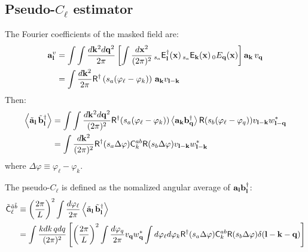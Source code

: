 \documentclass[a4paper,10pt]{article}
\begin{document}
  \subsection{Pseudo-$C_\ell$ estimator}
    The Fourier coefficients of the masked field are:
    \begin{align}
      {\bf a}^v_{\bf l}&=\int\int\frac{d{\bf k}^2d{\bf q}^2}{2\pi}\left[\int\frac{d{\bf x}^2}{(2\pi)^2}\,_{s_a}{\sf E}^\dag_{\bf l}({\bf x})\,_{s_a}{\sf E}_{\bf k}({\bf x})\,_0E_{\bf q}({\bf x})\right]{\bf a}_{\bf k}\,v_{\bf q}\\
                       &=\int\frac{d{\bf k}^2}{2\pi}{\sf R}^\dag\left(s_a(\varphi_\ell-\varphi_k)\right)\,{\bf a}_{\bf k}v_{{\bf l}-{\bf k}}
    \end{align}
    Then:
    \begin{align}
      \left\langle\tilde{\bf a}_{\bf l}\,\tilde{\bf b}^\dag_{\bf l}\right\rangle
      &=\int\int\frac{d{\bf k}^2d{\bf q}^2}{(2\pi)^2}{\sf R}^\dag(s_a(\varphi_\ell-\varphi_k))\left\langle{\bf a}_{\bf k}{\bf b}^\dag_{\bf q}\right\rangle{\sf R}(s_b(\varphi_\ell-\varphi_q))v_{{\bf l}-{\bf k}}w^*_{{\bf l}-{\bf q}}\\
      &=\int\frac{d{\bf k}^2}{(2\pi)^2}{\sf R}^\dag(s_a\Delta\varphi){\sf C}^{ab}_k{\sf R}(s_b\Delta\varphi)v_{{\bf l}-{\bf k}}w^*_{{\bf l}-{\bf k}}
    \end{align}
    where $\Delta\varphi\equiv\varphi_\ell-\varphi_k$.
    
    The pseudo-$C_\ell$ is defined as the nomalized angular average of ${\bf a}_{\bf l}{\bf b}^\dag_{\bf l}$:
    \begin{align}
      \tilde{\sf C}^{\tilde{a}\tilde{b}}_\ell
      &\equiv\left(\frac{2\pi}{L}\right)^2\int\frac{d\varphi_\ell}{2\pi}\left\langle\tilde{\bf a}_{\bf l}\,\tilde{\bf b}^\dag_{\bf l}\right\rangle\\
      &=\int\frac{kdk\,qdq}{(2\pi)^2}\left[\left(\frac{2\pi}{L}\right)^2\int\frac{d\varphi_q}{2\pi}v_{{\bf q}}w^*_{{\bf q}}
      \int d\varphi_\ell d\varphi_k{\sf R}^\dag(s_a\Delta\varphi){\sf C}^{ab}_k{\sf R}(s_b\Delta\varphi)\delta({\bf l}-{\bf k}-{\bf q})\right]
    \end{align}
    
\end{document}
